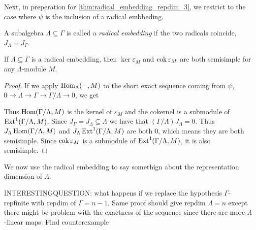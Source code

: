 Next, in preperation for \cref{thm:radical_embedding_repdim_3}, we restrict to the case where $\psi$ is the inclusion of a radical embbeding.

\begin{defn}
	A subalgebra $\Lambda \subseteq \Gamma$ is called a \emph{radical embedding} if the two radicals coincide, $J_\Lambda = J_\Gamma$.
\end{defn}

\begin{lemma}\cite[Lemma~2.3]{EHIS04}\label{lem:epsilon_semisimple_(co)kernel}
	If $\Lambda \subseteq \Gamma$ is a radical embedding, then $\ker \varepsilon_M$ and $\operatorname{cok}\varepsilon_M$ are both semisimple for any $\Lambda$-module $M$.
	\begin{proof}
		If we apply $\operatorname{Hom}_\Lambda(-, M)$ to the short exact sequence coming from $\psi$, $0 \to \Lambda \to \Gamma \to \Gamma/\Lambda \to 0$, we get 
		\begin{center}
		\end{center}
		Thus $\operatorname{Hom}(\Gamma/\Lambda, M)$ is the kernel of $\varepsilon_M$ and the cokernel is a submodule of $\operatorname{Ext}^1(\Gamma/\Lambda, M)$. Since $J_\Gamma = J_\Lambda \subseteq \Lambda$ we have that $(\Gamma/\Lambda)J_\Lambda = 0$. Thus $J_\Lambda\operatorname{Hom}(\Gamma/\Lambda, M)$ and $J_\Lambda\operatorname{Ext}^1(\Gamma/\Lambda, M)$ are both 0, which means they are both semisimple. Since $\operatorname{cok}\varepsilon_M$ is a submodule of $\operatorname{Ext}^1(\Gamma/\Lambda, M)$, it is also semisimple.
	\end{proof}
\end{lemma}

We now use the radical embedding to say somethign about the representation dimension of $\Lambda$.

INTERESTINGQUESTION: what happens if we replace the hypothesis $\Gamma$-repfinite with repdim of $\Gamma= n-1$. Same proof should give repdim $\Lambda=n$ except there might be problem with the exactness of the sequence since there are more $\Lambda$-linear maps. Find counterexample 

